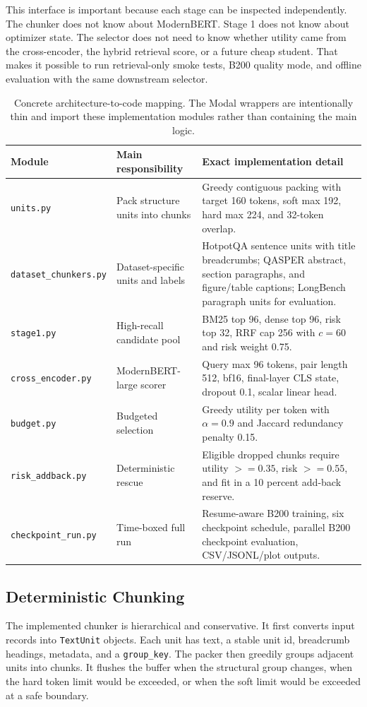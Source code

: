 \documentclass[10pt,twocolumn]{article}
\begin{document}
This interface is important because each stage can be inspected independently. The chunker does not know about ModernBERT. Stage 1 does not know about optimizer state. The selector does not need to know whether utility came from the cross-encoder, the hybrid retrieval score, or a future cheap student. That makes it possible to run retrieval-only smoke tests, B200 quality mode, and offline evaluation with the same downstream selector.

\begin{table}[t]
\centering
\small
\begin{tabular}{p{}p{}p{}}
\toprule
Module & Main responsibility & Exact implementation detail\\
\midrule
\texttt{units.py} & Pack structure units into chunks & Greedy contiguous packing with target 160 tokens, soft max 192, hard max 224, and 32-token overlap.\\
\texttt{dataset\_chunkers.py} & Dataset-specific units and labels & HotpotQA sentence units with title breadcrumbs; QASPER abstract, section paragraphs, and figure/table captions; LongBench paragraph units for evaluation.\\
\texttt{stage1.py} & High-recall candidate pool & BM25 top 96, dense top 96, risk top 32, RRF cap 256 with $c=60$ and risk weight 0.75.\\
\texttt{cross\_encoder.py} & ModernBERT-large scorer & Query max 96 tokens, pair length 512, bf16, final-layer CLS state, dropout 0.1, scalar linear head.\\
\texttt{budget.py} & Budgeted selection & Greedy utility per token with $\alpha=0.9$ and Jaccard redundancy penalty 0.15.\\
\texttt{risk\_addback.py} & Deterministic rescue & Eligible dropped chunks require utility $>=0.35$, risk $>=0.55$, and fit in a 10 percent add-back reserve.\\
\texttt{checkpoint\_run.py} & Time-boxed full run & Resume-aware B200 training, six checkpoint schedule, parallel B200 checkpoint evaluation, CSV/JSONL/plot outputs.\\
\bottomrule
\end{tabular}
\caption{Concrete architecture-to-code mapping. The Modal wrappers are intentionally thin and import these implementation modules rather than containing the main logic.}
\label{tab:code-map}
\end{table}

\subsection{Deterministic Chunking}
The implemented chunker is hierarchical and conservative. It first converts input records into \texttt{TextUnit} objects. Each unit has text, a stable unit id, breadcrumb headings, metadata, and a \texttt{group\_key}. The packer then greedily groups adjacent units into chunks. It flushes the buffer when the structural group changes, when the hard token limit would be exceeded, or when the soft limit would be exceeded at a safe boundary.
\end{document}
